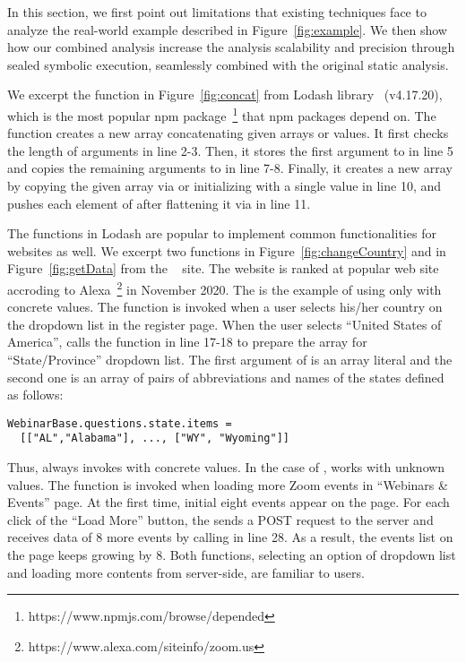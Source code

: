 In this section, we first point out limitations that existing techniques face to
analyze the real-world example described in Figure~\ref{fig:example}.
We then show how our combined analysis increase the analysis scalability and
precision through sealed symbolic execution, seamlessly combined with the original
static analysis.


We excerpt the  function in Figure~\ref{fig:concat} from Lodash
library~\cite{lodash} (v4.17.20), which is the most popular npm package~\footnote{https://www.npmjs.com/browse/depended}
that  npm packages depend on.
The  function creates a new array concatenating given arrays or
values.
It first checks the length of arguments in line 2-3. Then, it stores the first
argument to  in line 5 and copies the remaining arguments to
 in line 7-8.
Finally, it creates a new array by copying the given array via 
or initializing with a single value in line 10, and pushes each element of
 after flattening it via  in line 11.


The functions in Lodash are popular to implement common functionalities for
websites as well.
We excerpt two functions  in Figure~\ref{fig:changeCountry}
and  in Figure~\ref{fig:getData} from the ~\cite{zoom} site.
The website  is ranked at  popular web site accroding
to Alexa~\footnote{https://www.alexa.com/siteinfo/zoom.us} in November 2020.
The  is the example of using  only with
concrete values.
The  function is invoked when a user selects his/her
country on the dropdown list in the register page.
When the user selects ``United States of America'',  calls
the  function in line 17-18 to prepare the array for
``State/Province'' dropdown list.
The first argument of  is an array literal  and the second one is an array of pairs of abbreviations and names of
the states defined as follows:
\begin{lstlisting}[style=myJSstyle,numbers=none]
WebinarBase.questions.state.items =
  [["AL","Alabama"], ..., ["WY", "Wyoming"]]
\end{lstlisting}
Thus,  always invokes  with concrete values.
In the case of ,  works with unknown values.
The  function is invoked when loading more Zoom events in
``Webinars \& Events'' page.
At the first time, initial eight events appear on the page.
For each click of the ``Load More'' button, the  sends a POST
request to the server and receives data of 8 more events by calling  in line 28.
As a result, the events list on the page keeps growing by 8.
Both functions, selecting an option of dropdown list and loading more contents
from server-side, are familiar to users.



